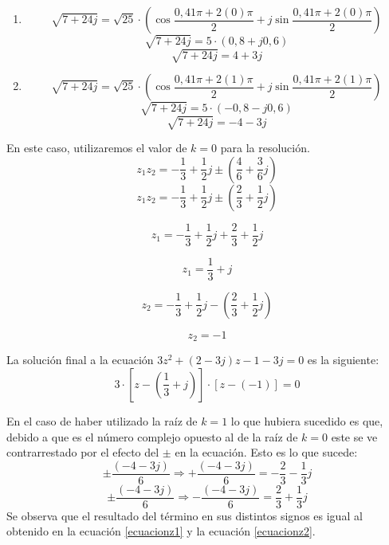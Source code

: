 \documentclass[a4paper, 12pt]{article}
\begin{document}
\begin{enumerate}
    \item[\textbf{k= 0}] 
    \[\sqrt{7+24j}=\sqrt{25}\cdot\left(\cos{\frac{0,41\pi+2(0)\pi}
            {2}}+j\sin{\frac{0,41\pi+2(0)\pi}{2}}\right)\]
            \[\sqrt{7+24j}= 5 \cdot(0,8+j0,6) \]
            \[\sqrt{7+24j}= 4 + 3j\]

            
    \item[\textbf{k= 1}]
    \[\sqrt{7+24j}=\sqrt{25}\cdot\left(\cos{\frac{0,41\pi+2(1)\pi}
            {2}}+j\sin{\frac{0,41\pi+2(1)\pi}{2}}\right)\]
            \[\sqrt{7+24j}= 5 \cdot(-0,8-j0,6) \]
            \[\sqrt{7+24j}= -4 - 3j\]
\end{enumerate}
En este caso, utilizaremos el valor de $k=0$ para la resolución.
\[z_1z_2= -\frac{1}{3}+\frac{1}{2}j \pm (\frac{4}{6}+\frac{3}{6}j)\]
\[z_1z_2= -\frac{1}{3}+\frac{1}{2}j \pm (\frac{2}{3}+\frac{1}{2}j)\]



\begin{equation}
        z_1= -\frac{1}{3}+\frac{1}{2}j + \frac{2}{3}+\frac{1}{2}j
        \label{ecuacionz1}
\end{equation}

\begin{equation*}
    \boxed{z_1=\frac{1}{3}+j}
\end{equation*}

\begin{equation}
        z_2= -\frac{1}{3}+\frac{1}{2}j - (\frac{2}{3}+\frac{1}{2}j)
        \label{ecuacionz2}
\end{equation}

\begin{equation*}
    \boxed{z_2=-1}
\end{equation*} 


La solución final a la ecuación $3z^2 + (2-3j) z -1-3j= 0$ es la siguiente:
\begin{equation*}
    \boxed{3\cdot[z-(\frac{1}{3}+j)]\cdot[z-(-1)]=0}
\end{equation*}

En el caso de haber utilizado la raíz de $k=1$ lo que hubiera sucedido es que, debido a que
es el número complejo opuesto al de la raíz de $k=0$ este se ve contrarrestado por el efecto
del $\pm$ en la ecuación. Esto es lo que sucede:
\[\pm \frac{(-4-3j)}{6} \Rightarrow + \frac{(-4-3j)}{6}=-\frac{2}{3}-\frac{1}{3}j\]
\[\pm \frac{(-4-3j)}{6}\Rightarrow-\frac{(-4-3j)}{6}=\frac{2}{3}+\frac{1}{3}j\]
Se observa que el resultado del término en sus distintos signos es igual al obtenido
en la ecuación \eqref{ecuacionz1} y la ecuación \eqref{ecuacionz2}.
\end{document}
